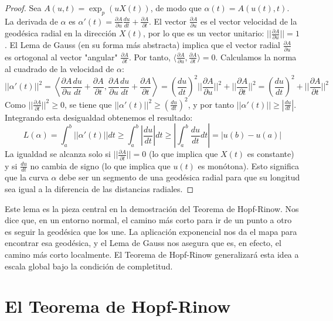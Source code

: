 \documentclass[12pt, a4paper]{report}
\theoremstyle{miestilo}
\theoremstyle{midefinicion}
\begin{document}
\begin{proof}
Sea $A(u,t) = \exp_p(uX(t))$, de modo que $\alpha(t) = A(u(t), t)$. La derivada de $\alpha$ es $\alpha'(t) = \frac{\partial A}{\partial u}\frac{du}{dt} + \frac{\partial A}{\partial t}$.
El vector $\frac{\partial A}{\partial u}$ es el vector velocidad de la geodésica radial en la dirección $X(t)$, por lo que es un vector unitario: $||\frac{\partial A}{\partial u}||=1$.
El Lema de Gauss (en su forma más abstracta) implica que el vector radial $\frac{\partial A}{\partial u}$ es ortogonal al vector "angular" $\frac{\partial A}{\partial t}$. Por tanto, $\langle \frac{\partial A}{\partial u}, \frac{\partial A}{\partial t} \rangle = 0$.
Calculamos la norma al cuadrado de la velocidad de $\alpha$:
$$ ||\alpha'(t)||^2 = \left\langle \frac{\partial A}{\partial u}\frac{du}{dt} + \frac{\partial A}{\partial t}, \frac{\partial A}{\partial u}\frac{du}{dt} + \frac{\partial A}{\partial t} \right\rangle = \left(\frac{du}{dt}\right)^2 ||\frac{\partial A}{\partial u}||^2 + ||\frac{\partial A}{\partial t}||^2 = \left(\frac{du}{dt}\right)^2 + ||\frac{\partial A}{\partial t}||^2 $$
Como $||\frac{\partial A}{\partial t}||^2 \ge 0$, se tiene que $||\alpha'(t)||^2 \ge (\frac{du}{dt})^2$, y por tanto $||\alpha'(t)|| \ge |\frac{du}{dt}|$.
Integrando esta desigualdad obtenemos el resultado:
$$ L(\alpha) = \int_a^b ||\alpha'(t)|| dt \ge \int_a^b \left|\frac{du}{dt}\right| dt \ge \left|\int_a^b \frac{du}{dt} dt\right| = |u(b) - u(a)| $$
La igualdad se alcanza solo si $||\frac{\partial A}{\partial t}|| = 0$ (lo que implica que $X(t)$ es constante) y si $\frac{du}{dt}$ no cambia de signo (lo que implica que $u(t)$ es monótona). Esto significa que la curva $\alpha$ debe ser un segmento de una geodésica radial para que su longitud sea igual a la diferencia de las distancias radiales.
\end{proof}

Este lema es la pieza central en la demostración del Teorema de Hopf-Rinow. Nos dice que, en un entorno normal, el camino más corto para ir de un punto a otro es seguir la geodésica que los une. La aplicación exponencial nos da el mapa para encontrar esa geodésica, y el Lema de Gauss nos asegura que es, en efecto, el camino más corto localmente. El Teorema de Hopf-Rinow generalizará esta idea a escala global bajo la condición de completitud.

\chapter{El Teorema de Hopf-Rinow}
\end{document}
